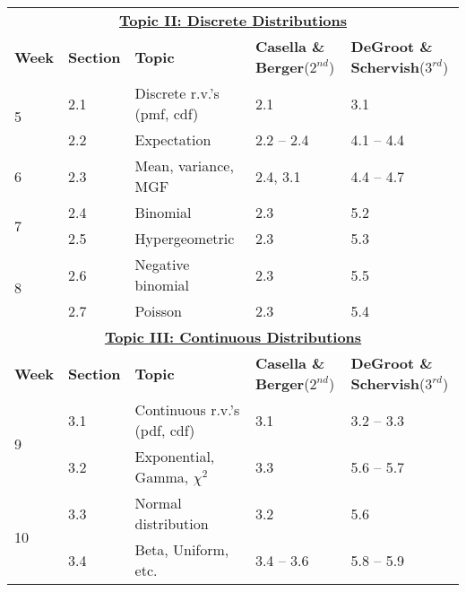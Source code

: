 \documentclass[12pt]{article}
\begin{document}
\begin{landscape}
\begin{table}[htbp]
\begin{tabular}{
    p{1.8cm}    %
    p{1.8cm}    %
    p{6.4cm}    %
    p{5cm}      %
    p{5.1cm}    %
    }
\multicolumn{5}{c}{\textbf{\underline{Topic II: Discrete Distributions}}}\\[2pt]
\textbf{Week} & \textbf{Section} & \textbf{Topic} & \textbf{Casella \& Berger}\footnotesize{($2^{nd}$)} & \textbf{DeGroot \& Schervish}\footnotesize{($3^{rd}$)}\\
\midrule
\multirow{2}{*}{5}%
    &   2.1 & Discrete r.v.’s (pmf, cdf)    & 2.1       & 3.1\\[2pt]
    &   2.2 & Expectation                   & 2.2 – 2.4 & 4.1 – 4.4\\[10pt]
6   &   2.3 & Mean, variance, MGF           & 2.4, 3.1  & 4.4 – 4.7\\[10pt]
\multirow{2}{*}{7}%
    &   2.4 & Binomial                      & 2.3       & 5.2\\[2pt]
    &   2.5 & Hypergeometric                & 2.3       & 5.3\\[10pt]
\multirow{2}{*}{8}%
    &   2.6 & Negative binomial             & 2.3       & 5.5\\[2pt]
    &   2.7 & Poisson                       & 2.3       & 5.4\\[2pt]
\midrule


\multicolumn{5}{c}{\textbf{\underline{Topic III: Continuous Distributions}}}\\[2pt]
\textbf{Week} & \textbf{Section} & \textbf{Topic} & \textbf{Casella \& Berger}\footnotesize{($2^{nd}$)} & \textbf{DeGroot \& Schervish}\footnotesize{($3^{rd}$)}\\
\midrule
\multirow{2}{*}{9}%
    &   3.1 & Continuous r.v.’s (pdf, cdf)  & 3.1       & 3.2 – 3.3\\[2pt]
    &   3.2 & Exponential, Gamma, $\chi^2$  & 3.3       & 5.6 – 5.7\\[10pt]
\multirow{2}{*}{10}%
    &  3.3 & Normal distribution           & 3.2       & 5.6\\[2pt]
    &  3.4 & Beta, Uniform, etc.           & 3.4 – 3.6 & 5.8 – 5.9\\[2pt]
\bottomrule
\end{tabular}
\end{table}
\end{landscape}
\end{document}
